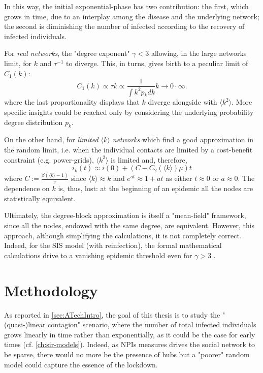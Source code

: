 \documentclass[a4paper,10pt,twoside]{book} %
\theoremstyle{definition}
\begin{document}
In this way, the initial exponential-phase has two contribution: the first, which grows in time, due to an interplay among the disease and the underlying network; the second is diminishing the number of infected according to the recovery of infected individuals.

For \textit{real networks}, the "degree exponent" $\gamma<3$ allowing, in the large networks limit, for $k$ and $\tau^{-1}$ to diverge. This, in turns, gives birth to a peculiar limit of $C_1(k)$: \vspace{3mm}
\begin{equation}
	C_1(k)\propto \tau k \propto \frac{1}{\int k^2 p_k dk}k  \to 0 \cdot \infty.
\end{equation}
where the last proportionality displays that $k$ diverge alongside with $\langle k^2 \rangle$. More specific insights could be reached only by considering the underlying probability degree distribution $p_k$.

On the other hand, for \textit{limited $\langle k \rangle$ networks} which find a good approximation in the random limit, i.e. when the individual contacts are limited by a cost-benefit constraint (e.g. power-grids), $\langle k^2 \rangle $ is limited and, therefore,
\begin{equation}
	i_k(t) \approx i(0)  + \left(C - C_2(\langle k \rangle )\mu \right) t
\end{equation}
where $C:= \frac{\beta (\langle k \rangle -1)}{\tau}$ since $\langle k \rangle \approx k$ and $e^{at}\approx1+at$ as either $t\approx0$ or $a \approx 0$. \vspace{3mm} The dependence on $k$ is, thus, lost: at the beginning of an epidemic all the nodes are statistically equivalent.

Ultimately, the degree-block approximation is itself a "mean-field" framework, since all the nodes, endowed with the same degree, are equivalent. However, this approach, although simplifying the calculations, it is not completely correct. Indeed, for the SIS model (with reinfection), the formal mathematical calculations drive to a vanishing epidemic threshold even for $\gamma>3$ \cite{barabasi::2016networkbook}. 

\chapter{Methodology}
\label{ch:Methodology}
As reported in \autoref{sec:ATechIntro}, the goal of this thesis is to study the "(quasi-)linear contagion" scenario, where the number of total infected individuals grows linearly in time rather than exponentially, as it could be the case for early times (cf. \autoref{ch:sir-models}). Indeed, as NPIs measures drives the social network to be sparse, there would no more be the presence of hubs but a "poorer" random model could capture the essence of the lockdown.
\end{document}
